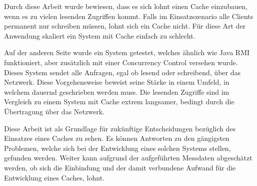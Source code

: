 Durch diese Arbeit wurde bewiesen, dass es sich lohnt einen Cache einzubauen, wenn es zu vielen lesenden Zugriffen kommt. Falls im Einsatzszenario alle Clients permanent nur schreiben müssen, lohnt sich ein Cache nicht. Für diese Art der Anwendung skaliert ein System mit Cache einfach zu schlecht. 

Auf der anderen Seite wurde ein System getestet, welches ähnlich wie Java RMI funktioniert, aber zusätzlich mit einer Concurrency Control versehen wurde. Dieses System sendet alle Anfragen, egal ob lesend oder schreibend, über das Netzwerk. Diese Vorgehensweise beweist seine Stärke in einem Umfeld, in welchem dauernd geschrieben werden muss. Die lesenden Zugriffe sind im Vergleich zu einem System mit Cache extrem langsamer, bedingt durch die Übertragung über das Netzwerk.

Diese Arbeit ist als Grundlage für zukünftige Entscheidungen bezüglich des Einsatzes eines Caches zu sehen. Es können Antworten zu den gängigsten Problemen, welche sich bei der Entwicklung eines solchen Systems stellen, gefunden werden. Weiter kann aufgrund der aufgeführten Messdaten abgeschätzt werden, ob sich die Einbindung und der damit verbundene Aufwand für die Entwicklung eines Caches, lohnt.
